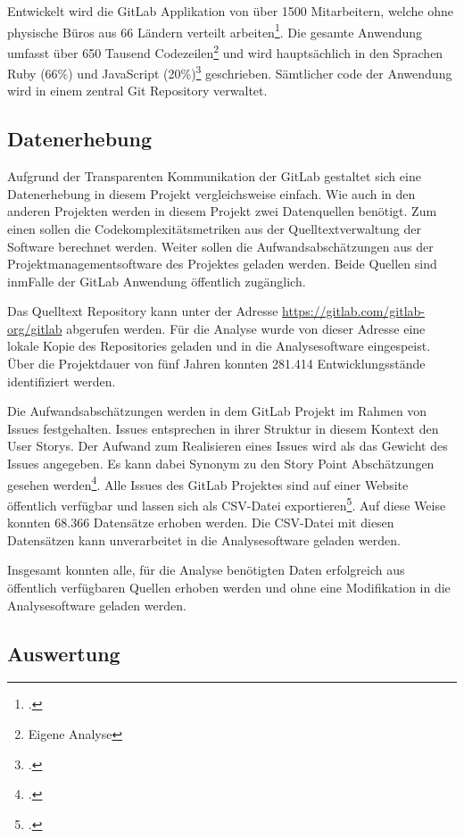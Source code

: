 Entwickelt wird die GitLab Applikation von über 1500 Mitarbeitern,
welche ohne physische Büros aus 66 Ländern verteilt arbeiten\footcite[Vgl. ][]{GitLabGitLab}.
Die gesamte Anwendung umfasst über 650 Tausend Codezeilen\footnote{Eigene
  Analyse} und wird hauptsächlich in den Sprachen Ruby (66\%) und
JavaScript (20\%)\footcite[Vgl. ][]{GitLabOrgGitLab} geschrieben. Sämtlicher code
der Anwendung wird in einem zentral Git Repository verwaltet.

\subsection{Datenerhebung}\label{gitlab-Datenerhebung}

Aufgrund der Transparenten Kommunikation der GitLab gestaltet sich eine
Datenerhebung in diesem Projekt vergleichsweise einfach. Wie auch in den
anderen Projekten werden in diesem Projekt zwei Datenquellen benötigt.
Zum einen sollen die Codekomplexitätsmetriken aus der
Quelltextverwaltung der Software berechnet werden. Weiter sollen die
Aufwandsabschätzungen aus der Projektmanagementsoftware des Projektes
geladen werden. Beide Quellen sind inmFalle der GitLab Anwendung
öffentlich zugänglich.

Das Quelltext Repository kann unter der Adresse
\url{https://gitlab.com/gitlab-org/gitlab} abgerufen werden. Für die
Analyse wurde von dieser Adresse eine lokale Kopie des Repositories
geladen und in die Analysesoftware eingespeist. Über die Projektdauer
von fünf Jahren konnten 281.414 Entwicklungsstände identifiziert werden.

Die Aufwandsabschätzungen werden in dem GitLab Projekt im Rahmen von
Issues festgehalten. Issues entsprechen in ihrer Struktur in diesem
Kontext den User Storys. Der Aufwand zum Realisieren eines Issues wird
als das Gewicht des Issues angegeben. Es kann dabei Synonym zu den Story
Point Abschätzungen gesehen werden\footcite[Vgl. ][]{ScaledAgileGitLab}. Alle
Issues des GitLab Projektes sind auf einer Website öffentlich verfügbar
und lassen sich als CSV-Datei exportieren\footcite[Vgl. ][]{IssuesGitLabOrg}. Auf
diese Weise konnten 68.366 Datensätze erhoben werden. Die CSV-Datei mit
diesen Datensätzen kann unverarbeitet in die Analysesoftware geladen
werden.

Insgesamt konnten alle, für die Analyse benötigten Daten erfolgreich aus
öffentlich verfügbaren Quellen erhoben werden und ohne eine Modifikation
in die Analysesoftware geladen werden.

\subsection{Auswertung}\label{gitlab-Auswertung}

